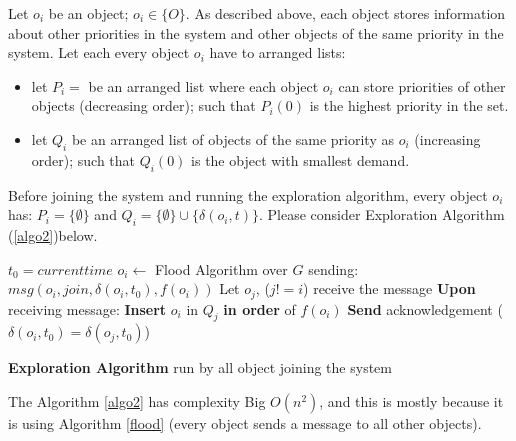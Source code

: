 \documentclass[../main/Self-Stabilization.tex]{subfiles}
\begin{document}
Let $o_{i}$ be an object; $o_{i} \in\{O\}$. As described above, each object stores information about other priorities in the system and other objects of the same priority in the system. Let each every object $o_{i}$ have to arranged lists:
\begin{itemize}
    \item let $P_{i}=$ be an arranged list where each object $o_{i}$ can store priorities of other objects (decreasing order); such that $P_{i}(0)$ is the highest priority in the set.
    \item let $Q_{i}$ be an arranged list of objects of the same priority as $o_{i}$ (increasing order); such that $Q_{i}(0)$ is the object with smallest demand.
\end{itemize}

Before joining the system and running the exploration algorithm, every object $o_{i}$ has: $P_{i}=\{\emptyset\}$ and $Q_{i}=\{\emptyset\}\cup\{\delta(o_{i},t)\}$. Please consider Exploration Algorithm (\ref{algo2})below.

\LinesNumbered
\IncMargin{1em}
\begin{algorithm}
$t_{0} = current time$
\BlankLine
$o_{i} \gets$ Flood Algorithm over $G$ \newline
sending: $msg(o_{i}, join, \delta(o_{i}, t_{0}), f(o_{i}))$
\BlankLine
{} {
    Let $o_{j}$, ($j!=i$) receive the message
    \BlankLine
    \textbf{Upon} receiving message:\newline
    {
       \textbf{Insert} $o_{i}$ in $Q_{j}$ \textbf{in order} of $f(o_{i})$
       \BlankLine
       \textbf{Send} acknowledgement ($\delta(o_{i},t_{0}) = \delta(o_{j},t_{0})$)
    }
}
\caption{\textbf{Exploration Algorithm} run by all object joining the system} \label{algo2}
\end{algorithm}
\DecMargin{1em}

The Algorithm \ref{algo2} has complexity Big $O (n^2)$, and this is mostly because it is using Algorithm \ref{flood} (every object sends a message to all other objects).
\end{document}
